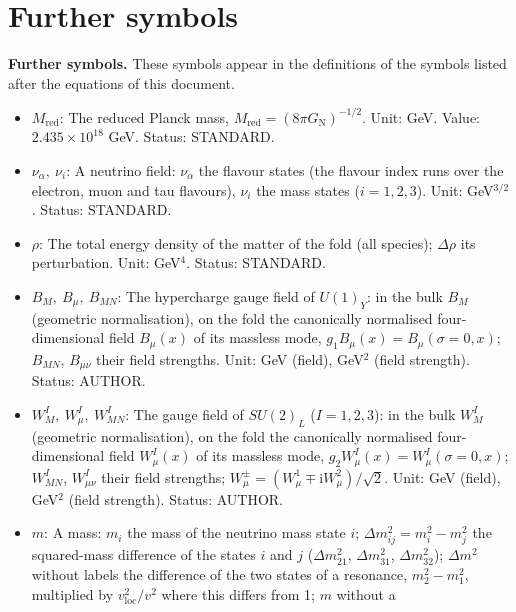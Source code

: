 \documentclass[
  10pt,
]{article}
\providecommand{\tightlist}{%
  \setlength{\itemsep}{0pt}\setlength{\parskip}{0pt}}
\begin{document}
\hypertarget{further-symbols}{%
\section{Further symbols}\label{further-symbols}}

\textbf{Further symbols.} These symbols appear in the definitions of the
symbols listed after the equations of this document.

\begin{itemize}
\tightlist
\item
  \(M_{\mathrm{red}}\): The reduced Planck mass,
  \(M_{\mathrm{red}} = (8\pi G_{\mathrm{N}})^{-1/2}\). Unit: GeV. Value:
  \(2.435\times10^{18}\) GeV. Status: STANDARD.
\item
  \(\nu_\alpha,\ \nu_i\): A neutrino field: \(\nu_\alpha\) the flavour
  states (the flavour index runs over the electron, muon and tau
  flavours), \(\nu_i\) the mass states (\(i = 1, 2, 3\)). Unit:
  GeV\(^{3/2}\). Status: STANDARD.
\item
  \(\rho\): The total energy density of the matter of the fold (all
  species); \(\Delta\rho\) its perturbation. Unit: GeV\(^4\). Status:
  STANDARD.
\item
  \(B_M,\ B_\mu,\ B_{MN}\): The hypercharge gauge field of \(U(1)_Y\):
  in the bulk \(B_M\) (geometric normalisation), on the fold the
  canonically normalised four-dimensional field \(B_\mu(x)\) of its
  massless mode, \(g_1B_\mu(x) = B_\mu(\sigma = 0, x)\); \(B_{MN}\),
  \(B_{\mu\nu}\) their field strengths. Unit: GeV (field), GeV\(^2\)
  (field strength). Status: AUTHOR.
\item
  \(W^I_M,\ W^I_\mu,\ W^I_{MN}\): The gauge field of \(SU(2)_L\)
  (\(I = 1, 2, 3\)): in the bulk \(W^I_M\) (geometric normalisation), on
  the fold the canonically normalised four-dimensional field
  \(W^I_\mu(x)\) of its massless mode,
  \(g_2W^I_\mu(x) = W^I_\mu(\sigma = 0, x)\); \(W^I_{MN}\),
  \(W^I_{\mu\nu}\) their field strengths;
  \(W^\pm_\mu = (W^1_\mu \mp \mathrm{i}W^2_\mu)/\sqrt2\). Unit: GeV
  (field), GeV\(^2\) (field strength). Status: AUTHOR.
\item
  \(m\): A mass: \(m_i\) the mass of the neutrino mass state \(i\);
  \(\Delta m_{ij}^2 = m_i^2 - m_j^2\) the squared-mass difference of the
  states \(i\) and \(j\) (\(\Delta m_{21}^2\), \(\Delta m_{31}^2\),
  \(\Delta m_{32}^2\)); \(\Delta m^2\) without labels the difference of
  the two states of a resonance, \(m_2^2 - m_1^2\), multiplied by
  \(v_{\mathrm{loc}}^2/v^2\) where this differs from 1; \(m\) without a

\end{itemize}
\end{document}
